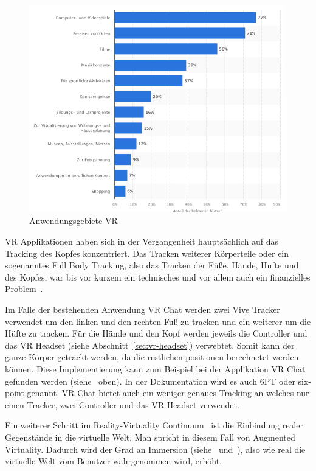 \begin{figure}
    \begin{center}
        \includegraphics[scale=0.4]{pics/statistic_usage_vr}
    \end{center}
    \caption{Anwendungsgebiete VR~\cite{BITKOM_2021}}
    \label{fig:statistic_usage_vr}
\end{figure}

VR Applikationen haben sich in der Vergangenheit hauptsächlich auf das Tracking des Kopfes konzentriert.
Das Tracken weiterer Körperteile oder ein sogenanntes Full Body Tracking, also das Tracken der Füße, Hände, Hüfte und des Kopfes, war bis vor kurzem ein technisches und vor allem auch ein finanzielles Problem~\cite{PAVEL_NUZHDIN_2020}.

Im Falle der bestehenden Anwendung VR Chat werden zwei Vive Tracker verwendet um den linken und den rechten Fuß zu tracken und ein weiterer um die Hüfte zu tracken.
Für die Hände und den Kopf werden jeweils die Controller und das VR Headset (siehe Abschnitt~\ref{sec:vr-headset}) verwebtet.
Somit kann der ganze Körper getrackt werden, da die restlichen positionen berechnetet werden können.
Diese Implementierung kann zum Beispiel bei der Applikation VR Chat gefunden werden (siehe~\cite{VRCHAT_DOCS_2021} oben).
In der Dokumentation wird es auch 6PT oder six-point genannt.
VR Chat bietet auch ein weniger genaues Tracking an welches nur einen Tracker, zwei Controller und das VR Headset verwendet.

Ein weiterer Schritt im Reality-Virtuality Continuum~\cite{MILGRAM_1994} ist die Einbindung realer Gegenstände in die virtuelle Welt.
Man spricht in diesem Fall von Augmented Virtuality.
Dadurch wird der Grad an Immersion (siehe~\cite{EMEST_ADAMS_2004} und~\cite{BJOERK_2003}), also wie real die virtuelle Welt vom Benutzer wahrgenommen wird, erhöht.

